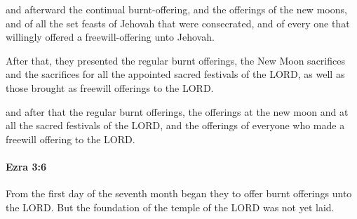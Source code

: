 			\begin{versebox}
					\item[BHS] 
					\item[LXX] 
					\item[ASV] and afterward the continual burnt-offering, and the offerings of the new moons, and of all the set feasts of Jehovah that were consecrated, and of every one that willingly offered a freewill-offering unto Jehovah.
					\item[NIV] After that, they presented the regular burnt offerings, the New Moon sacrifices and the sacrifices for all the appointed sacred festivals of the LORD, as well as those brought as freewill offerings to the LORD.
					\item[NRSV] and after that the regular burnt offerings, the offerings at the new moon and at all the sacred festivals of the LORD, and the offerings of everyone who made a freewill offering to the LORD.
			\end{versebox}

		\paragraph{Ezra 3:6} %
			\label{EZRA-3-6}

			From the first day of the seventh month began they to offer burnt offerings unto the LORD. But the foundation of the temple of the LORD was not yet laid.

